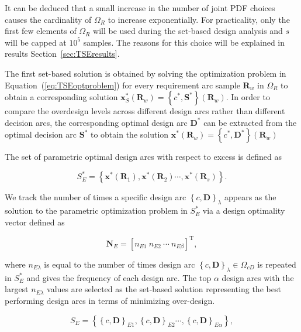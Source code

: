 It can be deduced that a small increase in the number of joint \ac{PDF} choices causes the cardinality of $\Omega_R$ to increase exponentially. For practicality, only the first few elements of $\Omega_R$ will be used during the set-based design analysis and $s$ will be capped at $10^5$ samples. The reasons for this choice will be explained in results Section~\ref{sec:TSEresults}.

The first set-based solution is obtained by solving the optimization problem in Equation~(\ref{eq:TSEoptproblem}) for every requirement arc sample $\mathbf{R}_w$ in $\Omega_R$ to obtain a corresponding solution $\mathbf{x}_S^*(\mathbf{R}_w) = \left\{c^*,\mathbf{S}^*\right\}(\mathbf{R}_w)$. In order to compare the overdesign levels across different design arcs rather than different decision arcs, the corresponding optimal design arc $\mathbf{D}^*$ can be extracted from the optimal decision arc $\mathbf{S}^*$ to obtain the solution $\mathbf{x}^*(\mathbf{R}_w) = \left\{c^*,\mathbf{D}^*\right\}(\mathbf{R}_w)$

The set of parametric optimal design arcs with respect to excess is defined as

\begin{equation} \label{eq:SBDexcessopt}
	S_E^* = \left\{\mathbf{x}^*(\mathbf{R}_1),\mathbf{x}^*(\mathbf{R}_2)\cdots,\mathbf{x}^*(\mathbf{R}_s)\right\}.
\end{equation}

We track the number of times a specific design arc $\left\{c,\mathbf{D}\right\}_\lambda$ appears as the solution to the parametric optimization problem in $S_E^*$ via a design optimality vector defined as

\begin{equation} \label{eq:optimalityvec}
	\mathbf{N}_E = \left[n_{E1} ~ n_{E2} ~ \cdots ~ n_{E\beta}\right]^{\mathrm{T}},
\end{equation}

where $n_{E\lambda}$ is equal to the number of times design arc $\left\{c,\mathbf{D}\right\}_\lambda \in \Omega_{cD}$ is repeated in $S_E^*$ and gives the frequency of each design arc. The top $\alpha$ design arcs with the largest $n_{E\lambda}$ values are selected as the set-based solution representing the best performing design arcs in terms of minimizing over-design.

\begin{equation} \label{eq:SBDexcess}
	S_E = \left\{\left\{c,\mathbf{D}\right\}_{E1},\left\{c,\mathbf{D}\right\}_{E2}\cdots,\left\{c,\mathbf{D}\right\}_{E\alpha}\right\},
\end{equation}


